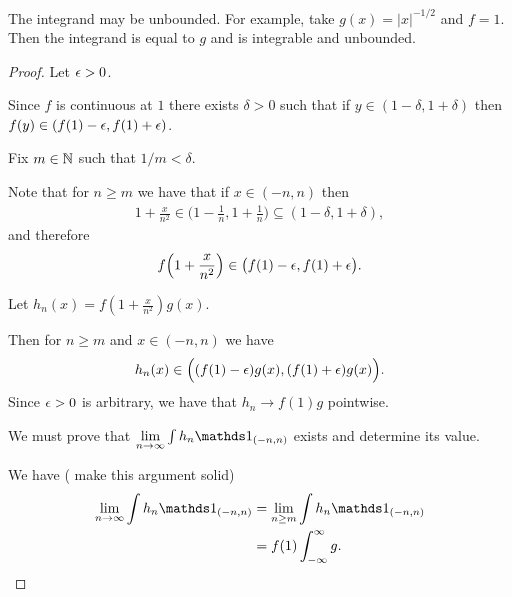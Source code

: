 


\begin{remark*}
  The integrand may be unbounded. For example, take $g(x) = |x|^{-1/2}$ and $f = 1$. Then the integrand is
  equal to $g$ and is integrable and unbounded.
\end{remark*}

\begin{proof}
    Let $\epsilon > 0$.

    Since $f$ is continuous at $1$ there exists $\delta > 0$ such that if $y \in (1 - \delta, 1 + \delta)$
    then $f(y) \in (f(1) - \epsilon, f(1) + \epsilon)$.

    Fix $m \in \mathbb{N}$ such that $1/m < \delta$.

    Note that for $n \geq m$ we have that if $x \in (-n, n)$
    then
    \begin{align*}
      1 + \frac{x}{n^2} \in \Big(1 - \frac{1}{n}, 1 + \frac{1}{n}\Big) \subseteq (1 - \delta, 1 + \delta),
    \end{align*}
    and therefore
    \begin{align*}
      f\Big(1 + \frac{x}{n^2}\Big) \in \big(f(1) - \epsilon, f(1) + \epsilon\big).
    \end{align*}

    Let $h_n(x) = f(1 +\frac{x}{n^{2}})g(x)$.

    Then for $n \geq m$ and $x \in (-n, n)$ we have
    \begin{align*}
      h_n(x) \in \Big((f(1) - \epsilon)g(x), (f(1) + \epsilon)g(x)\Big).
    \end{align*}
    Since $\epsilon > 0$ is arbitrary, we have that $h_n \to f(1)g$ pointwise.

    We must prove that $\limn \int h_n \ind_{(-n, n)}$ exists and determine its value.

    We have ( make this argument solid)
    \begin{align*}
      \limn \int h_n \ind_{(-n, n)}
      &= \lim_{n \geq m} \int h_n \ind_{(-n, n)} \\
      &= f(1)\int_{-\infty}^\infty g.
    \end{align*}
\end{proof}

